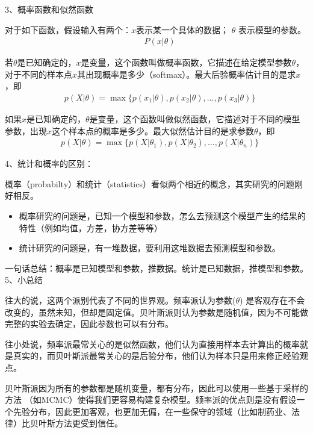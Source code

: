 3、概率函数和似然函数

对于如下函数，假设输入有两个：$x$表示某一个具体的数据； $\theta$ 表示模型的参数。
\begin{align}
& P(x|\theta)
\end{align}

若$\theta$是已知确定的，$x$是变量，这个函数叫做概率函数，它描述在给定模型参数$\theta$，对于不同的样本点$x$其出现概率是多少（softmax）。最大后验概率估计目的是求$x$，即
\begin{align}
& p(X|\theta) = \max\{p(x_1 | \theta),p( x_2 | \theta), ... , p( x_3 | \theta)\}
\end{align}

如果$x$是已知确定的，$\theta$是变量，这个函数叫做似然函数，它描述对于不同的模型参数，出现$x$这个样本点的概率是多少。最大似然估计目的是求参数$\theta$，即
\begin{align}
& p(X|\theta) = \max\{p(X | \theta_1),p( X | \theta_2), ... , p( X | \theta_n)\}
\end{align}

\quad

4、统计和概率的区别：

概率（probabilty）和统计（statistics）看似两个相近的概念，其实研究的问题刚好相反。
\begin{itemize}
    \item 概率研究的问题是，已知一个模型和参数，怎么去预测这个模型产生的结果的特性（例如均值，方差，协方差等等）
    \item 统计研究的问题是，有一堆数据，要利用这堆数据去预测模型和参数。
\end{itemize}

一句话总结：概率是已知模型和参数，推数据。统计是已知数据，推模型和参数。\\

5、小总结

往大的说，这两个派别代表了不同的世界观。频率派认为参数($\theta$) 是客观存在不会改变的，虽然未知，但却是固定值。贝叶斯派则认为参数是随机值，因为不可能做完整的实验去确定，因此参数也可以有分布。

往小处说，频率派最常关心的是似然函数，他们认为直接用样本去计算出的概率就是真实的，而贝叶斯派最常关心的是后验分布，他们认为样本只是用来修正经验观点。

贝叶斯派因为所有的参数都是随机变量，都有分布，因此可以使用一些基于采样的方法 （如MCMC）使得我们更容易构建复杂模型。频率派的优点则是没有假设一个先验分布，因此更加客观，也更加无偏，在一些保守的领域（比如制药业、法律）比贝叶斯方法更受到信任。

